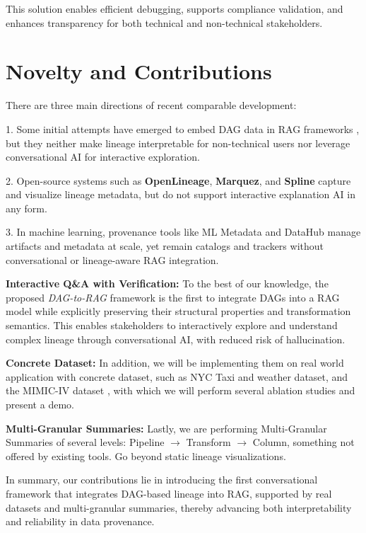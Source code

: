 \documentclass[9pt,letterpaper]{article}
\begin{document}
This solution enables efficient debugging, supports compliance validation, and enhances transparency for both technical and non-technical stakeholders.

\section{Novelty and Contributions}
There are three main directions of recent comparable development:

1. Some initial attempts have emerged to embed DAG data in RAG frameworks \cite{hu-etal-2025-grag}, but they neither make lineage interpretable for non-technical users nor leverage conversational AI for interactive exploration.

2. Open-source systems such as \textbf{OpenLineage}, \textbf{Marquez}, and \textbf{Spline} capture and visualize lineage metadata, but do not support interactive explanation AI in any form.

3. In machine learning, provenance tools like ML Metadata \cite{ma_mlmd_2024} and DataHub \cite{bhardwaj2015datahub} manage artifacts and metadata at scale, yet remain catalogs and trackers without conversational or lineage-aware RAG integration.

\textbf{Interactive Q\&A with Verification:}
To the best of our knowledge, the proposed \emph{DAG-to-RAG} framework is the first to integrate DAGs into a RAG model while explicitly preserving their structural properties and transformation semantics.
This enables stakeholders to interactively explore and understand complex lineage through conversational AI, with reduced risk of hallucination.

\textbf{Concrete Dataset:} In addition, we will be implementing them on real world application with concrete dataset, such as NYC Taxi \cite{sciencedirect2024} and weather dataset, and the MIMIC-IV dataset \cite{johnson_mimic-iv_2023}, with which we will perform several ablation studies and present a demo.

\textbf{Multi-Granular Summaries:} Lastly, we are performing Multi-Granular Summaries of several levels: Pipeline $\rightarrow$ Transform $\rightarrow$ Column, something not offered by existing tools. Go beyond static lineage visualizations.


In summary, our contributions lie in introducing the first conversational framework that integrates DAG-based lineage into RAG, supported by real datasets and multi-granular summaries, thereby advancing both interpretability and reliability in data provenance.
\end{document}
